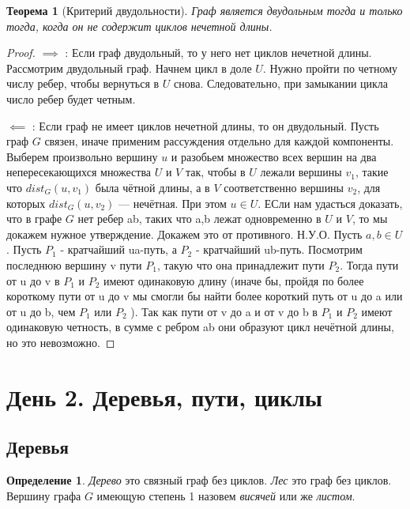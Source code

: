 \documentclass{article}
\newtheorem{theorem}{Теорема}
\theoremstyle{definition}
\newtheorem{definition}{Определение}[section]
\theoremstyle{remark}
\begin{document}
 \begin{theorem}[Критерий двудольности]
     Граф является двудольным тогда и только тогда, когда он не содержит циклов нечетной длины. 
 \end{theorem}
\begin{proof}

    $\implies$ : Если граф двудольный, то у него нет циклов нечетной длины. Рассмотрим двудольный граф. Начнем цикл в доле $U$. Нужно пройти по четному числу ребер, чтобы вернуться в $U$ снова. Следовательно, при замыкании цикла число ребер будет четным.
    
    $\impliedby$ : Если граф не имеет циклов нечетной длины, то он двудольный.
    Пусть граф $G$ связен, иначе применим рассуждения отдельно для каждой компоненты.
    Выберем произвольно вершину $u$ и разобьем множество всех вершин на два непересекающихся множества $U$ и $V$ так, чтобы в $U$ лежали вершины $v_1$, такие что $dist_G(u,v_1)$ была чётной длины, а в $V$ соответственно вершины $v_2$, для которых $dist_G(u,v_2)$ — нечётная. При этом $u \in U$. ЕСли нам удасться доказать, что в графе $G$ нет ребер ab, таких что a,b лежат одновременно в $U$ и $V$, то мы докажем нужное утверждение. Докажем это от противного.
    Н.У.О. Пусть $a,b \in U$. Пусть $P_1$ - кратчайший ua-путь, а $P_2$ - кратчайший ub-путь. Посмотрим последнюю вершину v пути $P_1$, такую что она принадлежит пути $P_2$. Тогда пути от u до v в $P_1$ и $P_2$ имеют одинаковую длину (иначе бы, пройдя по более короткому пути от u до v мы смогли бы найти более короткий путь от u до a или от u до b, чем $P_1$ или $P_2$ ). Так как пути от v до a и от v до b в $P_1$ и $P_2$ имеют одинаковую четность, в сумме с ребром ab они образуют цикл нечётной длины, но это невозможно.
\end{proof}

\section{День 2. Деревья, пути, циклы}

\subsection{Деревья}

\begin{definition}
    \textit{Дерево} это связный граф без циклов. \textit{Лес} это граф без циклов. Вершину графа $G$ имеющую степень 1 назовем \textit{висячей} или же \textit{листом}. 
\end{definition}
\end{document}
